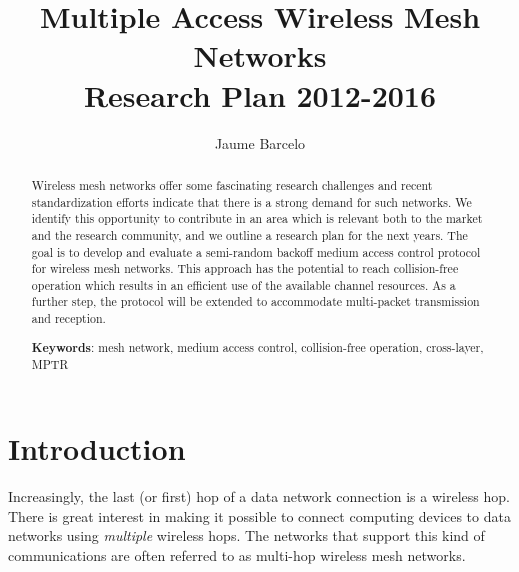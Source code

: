 \documentclass[a4paper,twocolumns]{article}%
\begin{document}
\title{Multiple Access Wireless Mesh Networks \\ Research Plan 2012-2016}

\author{Jaume Barcelo}


\date{}

\maketitle

\begin{abstract}
Wireless mesh networks offer some fascinating research challenges and recent standardization efforts indicate that there is a strong demand for such networks.
We identify this opportunity to contribute in an area which is relevant both to the market and the research community, and we outline a research plan for the next years.
The goal is to develop and evaluate a semi-random backoff medium access control protocol for wireless mesh networks.
This approach has the potential to reach collision-free operation which results in an efficient use of the available channel resources.
As a further step, the protocol will be extended to accommodate multi-packet transmission and reception.

\vspace{0.5cm}
\textbf{Keywords}: mesh network, medium access control, collision-free operation, cross-layer, MPTR

\end{abstract}

\tableofcontents

\clearpage


\section{Introduction}

Increasingly, the last (or first) hop of a data network connection is a wireless hop.
There is great interest in making it possible to connect computing devices to data networks using \emph{multiple} wireless hops.
The networks that support this kind of communications are often referred to as multi-hop wireless mesh networks.
\end{document}
